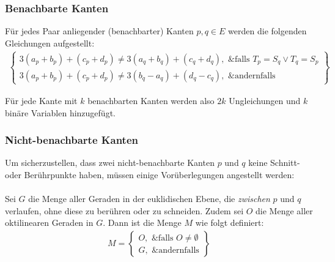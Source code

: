 \documentclass[a4paper,11pt]{amsart}
\begin{document}
\subsubsection*{Benachbarte Kanten} Für jedes Paar anliegender (benachbarter) Kanten $p, q \in E$ werden die folgenden Gleichungen aufgestellt:
\bigskip
\begin{gather*}
\left\{\begin{array}{lr}
    3 (a_p + b_p) + (c_p + d_p) \ne 3 (a_q + b_q) + (c_q + d_q), \text{ &falls } T_p = S_q \lor T_q = S_p \\
    3 (a_p + b_p) + (c_p + d_p) \ne 3 (b_q - a_q) + (d_q - c_q), \text{ &andernfalls}
\end{array}\right\}
\end{gather*}

\bigskip
\noindent Für jede Kante mit $k$ benachbarten Kanten werden also $2k$ Ungleichungen und $k$ binäre Variablen hinzugefügt.

\subsubsection*{Nicht-benachbarte Kanten}

Um sicherzustellen, dass zwei nicht-benachbarte Kanten $p$ und $q$ keine Schnitt- oder Berührpunkte haben, müssen einige Vorüberlegungen angestellt werden:\\\\
Sei $G$ die Menge aller Geraden in der euklidischen Ebene, die \textit{zwischen} $p$ und $q$ verlaufen, ohne diese zu berühren oder zu schneiden. Zudem sei $O$ die Menge aller oktilinearen Geraden in $G$. Dann ist die Menge $M$ wie folgt definiert:
\bigskip
\begin{gather*}
M = \left\{\begin{array}{lr}
    O, \text{ &falls } O \ne \emptyset \\
    G, \text{ &andernfalls}
\end{array}\right\}
\end{gather*}
\end{document}
